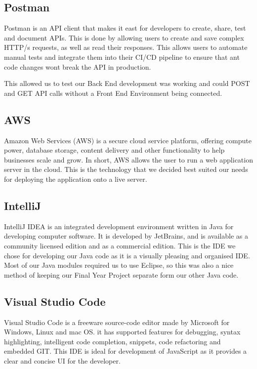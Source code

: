 \subsection{Postman}
Postman is an API client that makes it east for developers to create, share, test and document APIs. This is done by allowing users to create and save complex HTTP/s requests, as well as read their responses. This allows users to automate manual tests and integrate them into their CI/CD pipeline to ensure that ant code changes wont break the API in production. \par
This allowed us to test our Back End development was working and could POST and GET API calls without a Front End Environment being connected.

\subsection{AWS}
Amazon Web Services (AWS) is a secure cloud service platform, offering compute power, database storage, content delivery and other functionality to help businesses scale and grow. In short, AWS allows the user to run a web application server in the cloud. This is the technology that we decided best suited our needs for deploying the application onto a live server.

\subsection{IntelliJ}
IntelliJ IDEA is an integrated development environment written in Java for developing computer software. It is developed by JetBrains, and is available as a community licensed edition and as a commercial edition. This is the IDE we chose for developing our Java code as it is a visually pleasing and organised IDE. Most of our Java modules required us to use Eclipse, so this was also a nice method of keeping our Final Year Project separate form our other Java code.

\subsection{Visual Studio Code}
Visual Studio Code is a freeware source-code editor made by Microsoft for Windows, Linux and mac OS. it has supported features for debugging, syntax highlighting, intelligent code completion, snippets, code refactoring and embedded GIT. This IDE is ideal for development of JavaScript as it provides a clear and concise UI for the developer.

